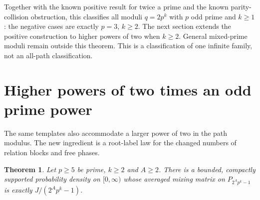 \documentclass[11pt,a4paper]{article}
\newtheorem{theorem}{Theorem}[section]
\theoremstyle{definition}\newtheorem{definition}[theorem]{Definition}
\theoremstyle{remark}\newtheorem{remark}[theorem]{Remark}
\begin{document}
Together with the known positive result for twice a prime and the
known parity-collision obstruction, this classifies all moduli
$q=2p^k$ with $p$ odd prime and $k\ge1$: the negative cases are
exactly $p=3$, $k\ge2$. The next section extends the positive
construction to higher powers of two when $k\ge2$. General
mixed-prime moduli remain outside this theorem. This is a
classification of one infinite family, not an all-path classification.


\section{Higher powers of two times an odd prime power}
\label{sec:higher-two-powers}

The same templates also accommodate a larger power of two in the
path modulus. The new ingredient is a root-label law for the changed
numbers of relation blocks and free phases.

\begin{theorem}\label{thm:higher-two-powers}
Let $p\ge5$ be prime, $k\ge2$ and $A\ge2$. There is a bounded,
compactly supported probability density on $[0,\infty)$ whose
averaged mixing matrix on $P_{2^A p^k-1}$ is exactly
$J/(2^A p^k-1)$.
\end{theorem}
\end{document}
